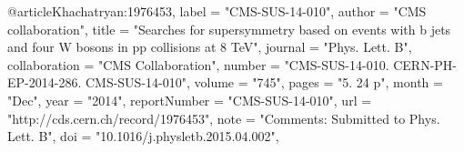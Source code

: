 @article{Khachatryan:1976453,
      label          = "CMS-SUS-14-010",
      author        = "{CMS collaboration}",
      title         = "{Searches for supersymmetry based on events with b jets
                       and four W bosons in pp collisions at 8 TeV}",
      journal       = "Phys. Lett. B",
      collaboration = "CMS Collaboration",
      number        = "CMS-SUS-14-010. CERN-PH-EP-2014-286. CMS-SUS-14-010",
      volume        = "745",
      pages         = "5. 24 p",
      month         = "Dec",
      year          = "2014",
      reportNumber  = "CMS-SUS-14-010",
      url           = "http://cds.cern.ch/record/1976453",
      note          = "Comments: Submitted to Phys. Lett. B",
      doi           = "10.1016/j.physletb.2015.04.002",
}

